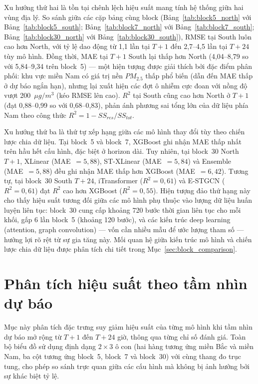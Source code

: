 Xu hướng thứ hai là tồn tại chênh lệch hiệu suất mang tính hệ thống giữa hai vùng địa lý. So sánh giữa các cặp bảng cùng block (Bảng~\ref{tab:block5_north} với Bảng~\ref{tab:block5_south}; Bảng~\ref{tab:block7_north} với Bảng~\ref{tab:block7_south}; Bảng~\ref{tab:block30_north} với Bảng~\ref{tab:block30_south}), RMSE tại South luôn cao hơn North, với tỷ lệ dao động từ 1,1 lần tại $T{+}1$ đến 2,7--4,5 lần tại $T{+}24$ tùy mô hình. Đồng thời, MAE tại $T{+}1$ South lại thấp hơn North (4,04--8,79 so với 5,84--9,34 trên block~5) --- một hiện tượng được giải thích bởi đặc điểm phân phối: khu vực miền Nam có giá trị nền $PM_{2.5}$ thấp phổ biến (dẫn đến MAE thấp ở dự báo ngắn hạn), nhưng lại xuất hiện các đợt ô nhiễm cực đoan với nồng độ vượt 200~$\mu g/m^3$ (kéo RMSE lên cao). $R^2$ tại South cũng cao hơn North ở $T{+}1$ (đạt 0,88--0,99 so với 0,68--0,83), phản ánh phương sai tổng lớn của dữ liệu phía Nam theo công thức $R^2 = 1 - SS_{res}/SS_{tot}$.

Xu hướng thứ ba là thứ tự xếp hạng giữa các mô hình thay đổi tùy theo chiến lược chia dữ liệu. Tại block~5 và block~7, XGBoost ghi nhận MAE thấp nhất trên hầu hết cấu hình, đặc biệt ở horizon dài. Tuy nhiên, tại block~30 North $T{+}1$, XLinear (MAE~$= 5{,}88$), ST-XLinear (MAE~$= 5{,}84$) và Ensemble (MAE~$= 5{,}88$) đều ghi nhận MAE thấp hơn XGBoost (MAE~$= 6{,}42$). Tương tự, tại block~30 South $T{+}24$, iTransformer ($R^2 = 0{,}61$) và E-STGCN ($R^2 = 0{,}61$) đạt $R^2$ cao hơn XGBoost ($R^2 = 0{,}55$). Hiện tượng đảo thứ hạng này cho thấy hiệu suất tương đối giữa các mô hình phụ thuộc vào lượng dữ liệu huấn luyện liên tục: block~30 cung cấp khoảng 720 bước thời gian liên tục cho mỗi khối, gấp 6 lần block~5 (khoảng 120 bước), và các kiến trúc deep learning (attention, graph convolution) --- vốn cần nhiều mẫu để ước lượng tham số --- hưởng lợi rõ rệt từ sự gia tăng này. Mối quan hệ giữa kiến trúc mô hình và chiến lược chia dữ liệu được phân tích chi tiết trong Mục~\ref{sec:block_comparison}.

\section{Phân tích hiệu suất theo tầm nhìn dự báo}

Mục này phân tích đặc trưng suy giảm hiệu suất của từng mô hình khi tầm nhìn dự báo mở rộng từ $T{+}1$ đến $T{+}24$ giờ, thông qua từng chỉ số đánh giá. Toàn bộ biểu đồ sử dụng định dạng $2 \times 3$ ô con (hai hàng tương ứng miền Bắc và miền Nam, ba cột tương ứng block~5, block~7 và block~30) với cùng thang đo trục tung, cho phép so sánh trực quan giữa các cấu hình mà không bị ảnh hưởng bởi sự khác biệt tỷ lệ.

